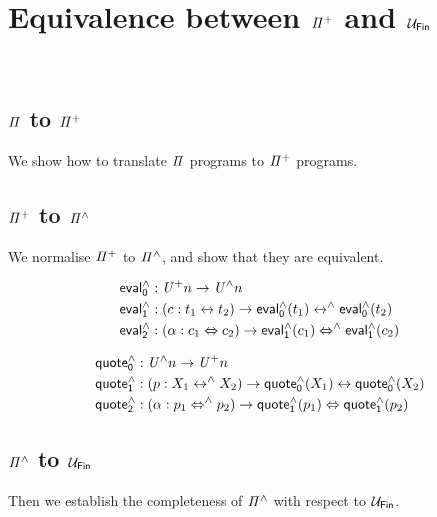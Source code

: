 \section{Equivalence between \texorpdfstring{$\mathit{{\Pi}^{+}}$}{Pi} and \texorpdfstring{$\UFin$}{UFin}}~\label{sec:equivalence}

\subsection{$\mathit{\Pi}$ to $\mathit{{\Pi}^{+}}$}

We show how to translate $\mathit{\Pi}$ programs to $\mathit{{\Pi}^{+}}$ programs.

\subsection{$\mathit{{\Pi}^{+}}$ to $\mathit{{\Pi}^{\wedge}}$}

We normalise $\mathit{{\Pi}^{+}}$ to $\mathit{{\Pi}^{\wedge}}$, and show that they are equivalent.

\begin{definition}
  \begin{align*}
    \evalh_{0} & : \UPlus n \to \UHat n \\
    \evalh_{1} & : (c : t_{1} \iso t_{2}) \to \evalh_{0}(t_{1}) \isoh \evalh_{0}(t_{2}) \\
    \evalh_{2} & : (\alpha : c_{1} \Iso c_{2}) \to \evalh_{1}(c_{1}) \Isoh \evalh_{1}(c_{2}) \\
  \end{align*}
\end{definition}

\begin{definition}
  \begin{align*}
    \quoteh_{0} & : \UHat n \to \UPlus n \\
    \quoteh_{1} & : (p : X_{1} \isoh X_{2}) \to \quoteh_{0}(X_{1}) \iso \quoteh_{0}(X_{2}) \\
    \quoteh_{2} & : (\alpha : p_{1} \Isoh p_{2}) \to \quoteh_{1}(p_{1}) \Iso \quoteh_{1}(p_{2}) \\
  \end{align*}
\end{definition}

\subsection{$\mathit{{\Pi}^{\wedge}}$ to $\UFin$}

Then we establish the completeness of $\mathit{{\Pi}^{\wedge}}$ with respect to $\UFin$.

